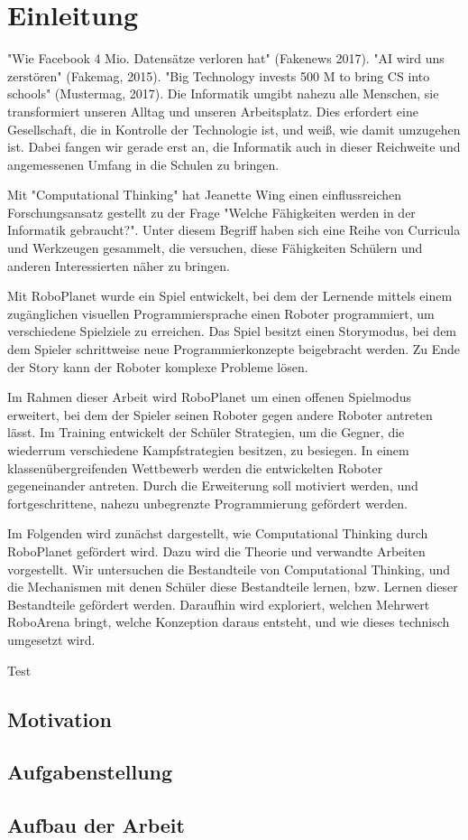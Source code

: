 \chapter{Einleitung}

"Wie Facebook 4 Mio. Datensätze verloren hat" (Fakenews 2017). "AI wird uns zerstören" (Fakemag,
2015). "Big Technology invests 500 M to bring CS into schools" (Mustermag, 2017). Die Informatik
umgibt nahezu alle Menschen, sie transformiert unseren Alltag und unseren Arbeitsplatz. Dies
erfordert eine Gesellschaft, die in Kontrolle der Technologie ist, und weiß, wie damit umzugehen
ist. Dabei fangen wir gerade erst an, die Informatik auch in dieser Reichweite und angemessenen
Umfang in die Schulen zu bringen.

Mit "Computational Thinking" hat Jeanette Wing einen einflussreichen Forschungsansatz gestellt zu
der Frage "Welche Fähigkeiten werden in der Informatik gebraucht?". Unter diesem Begriff haben sich
eine Reihe von Curricula und Werkzeugen gesammelt, die versuchen, diese Fähigkeiten Schülern und
anderen Interessierten näher zu bringen.

Mit RoboPlanet wurde ein Spiel entwickelt, bei dem der Lernende mittels einem zugänglichen visuellen
Programmiersprache einen Roboter programmiert, um verschiedene Spielziele zu erreichen. Das Spiel
besitzt einen Storymodus, bei dem dem Spieler schrittweise neue Programmierkonzepte beigebracht
werden. Zu Ende der Story kann der Roboter komplexe Probleme lösen.

Im Rahmen dieser Arbeit wird RoboPlanet um einen offenen Spielmodus erweitert, bei dem der Spieler
seinen Roboter gegen andere Roboter antreten lässt. Im Training entwickelt der Schüler Strategien,
um die Gegner, die wiederrum verschiedene Kampfstrategien besitzen, zu besiegen. In einem
klassenübergreifenden Wettbewerb werden die entwickelten Roboter gegeneinander antreten. Durch die
Erweiterung soll motiviert werden, und fortgeschrittene, nahezu unbegrenzte Programmierung gefördert
werden.

Im Folgenden wird zunächst dargestellt, wie Computational Thinking durch RoboPlanet gefördert wird.
Dazu wird die Theorie und verwandte Arbeiten vorgestellt. Wir untersuchen die Bestandteile von
Computational Thinking, und die Mechanismen mit denen Schüler diese Bestandteile lernen, bzw. Lernen
dieser Bestandteile gefördert werden. Daraufhin wird exploriert, welchen Mehrwert RoboArena bringt,
welche Konzeption daraus entsteht, und wie dieses technisch umgesetzt wird.

Test \cite{Ikeda1997}

\section{Motivation}

\section{Aufgabenstellung}

\section{Aufbau der Arbeit}

